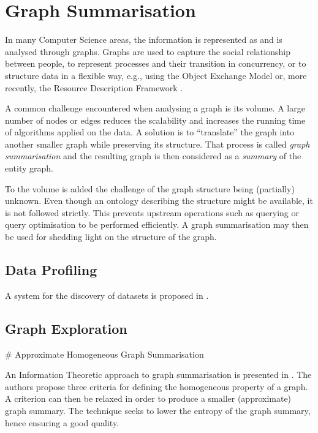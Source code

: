 \chapter{Graph Summarisation}
\label{chap:summary}

In many Computer Science areas, the information is represented as and is analysed through graphs. Graphs are used to capture the social relationship between people, to represent processes and their transition in concurrency, or to structure data in a flexible way, e.g., using the Object Exchange Model \cite{papakonstantinou:1995:oea} or, more recently, the Resource Description Framework \cite{rdfconcepts}.

A common challenge encountered when analysing a graph is its volume. A large number of nodes or edges reduces the scalability and increases the running time of algorithms applied on the data. A solution is to ``translate'' the graph into another smaller graph while preserving its structure. That process is called \emph{graph summarisation} and the resulting graph is then considered as a \emph{summary} of the entity graph.

To the volume is added the challenge of the graph structure being (partially) unknown. Even though an ontology describing the structure might be available, it is not followed strictly. This prevents upstream operations such as querying or query optimisation to be performed efficiently. A graph summarisation may then be used for shedding light on the structure of the graph.

\section{Data Profiling}

A system for the discovery of datasets is proposed in \cite{khatchadourian:2010:eswc}.

\section{Graph Exploration}

\# Approximate Homogeneous Graph Summarisation

An Information Theoretic approach to graph summarisation is presented in \cite{zheng:ipsj:2011}. The authors propose three criteria for defining the homogeneous property of a graph. A criterion can then be relaxed in order to produce a smaller (approximate) graph summary. The technique seeks to lower the entropy of the graph summary, hence ensuring a good quality.

